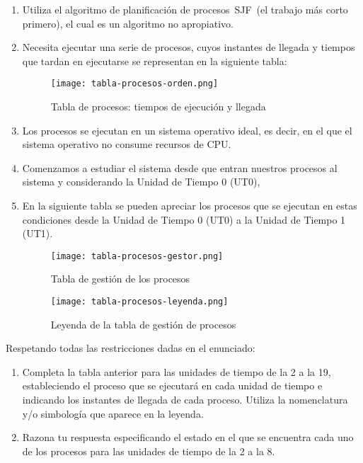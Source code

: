 \begin{enumerate}
    \item Utiliza el algoritmo de planificación de procesos SJF (el trabajo más corto primero), el cual es un algoritmo no apropiativo.
    \item Necesita ejecutar una serie de procesos, cuyos instantes de llegada y tiempos que tardan en ejecutarse se representan en la siguiente tabla:

    \begin{figure}[ht]
        \centering
        \texttt{[image: tabla-procesos-orden.png]}
        \caption{Tabla de procesos: tiempos de ejecución y llegada}
    \end{figure}

    \item Los procesos se ejecutan en un sistema operativo ideal, es decir, en el que el sistema operativo no consume recursos de CPU.
    \item Comenzamos a estudiar el sistema desde que entran nuestros procesos al sistema y considerando la Unidad de Tiempo 0 (UT0),
    \item En la siguiente tabla se pueden apreciar los procesos que se ejecutan en estas condiciones desde la Unidad de Tiempo 0 (UT0) a la Unidad de Tiempo 1 (UT1).

    \begin{figure}[ht]
        \centering
        \texttt{[image: tabla-procesos-gestor.png]}
        \caption{Tabla de gestión de los procesos}
    \end{figure}

    \begin{figure}[ht]
        \centering
        \texttt{[image: tabla-procesos-leyenda.png]}
        \caption{Leyenda de la tabla de gestión de procesos}
    \end{figure}
\end{enumerate}

Respetando todas las restricciones dadas en el enunciado:

\begin{enumerate}
    \item Completa la tabla anterior para las unidades de tiempo de la 2 a la 19, estableciendo el proceso que se ejecutará en cada unidad de tiempo e indicando los instantes de llegada de cada proceso. Utiliza la nomenclatura y/o simbología que aparece en la leyenda.
    \item Razona tu respuesta especificando el estado en el que se encuentra cada uno de los procesos para las unidades de tiempo de la 2 a la 8.
\end{enumerate}

